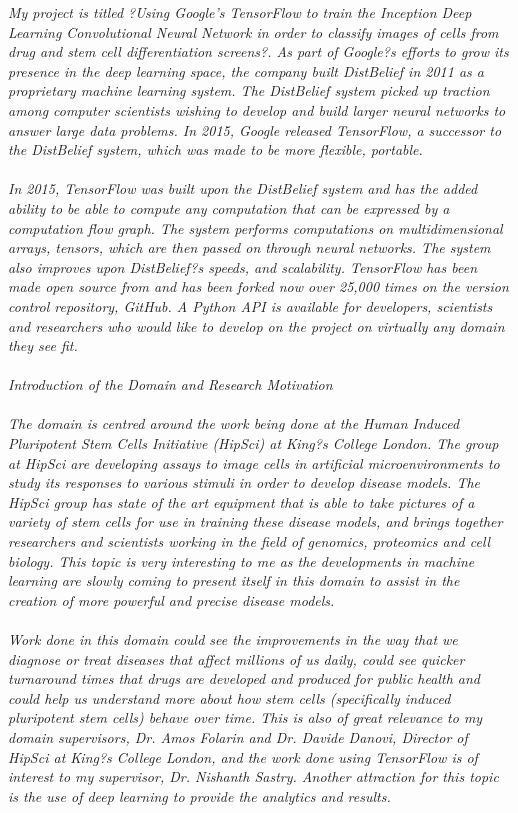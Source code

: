 \emph{My project is titled ?Using Google's TensorFlow to train the Inception Deep Learning Convolutional Neural Network in order to classify images of cells from drug and stem cell differentiation screens?. As part of Google?s efforts to grow its presence in the deep learning space, the company built DistBelief in 2011 as a proprietary machine learning system. The DistBelief system picked up traction among computer scientists wishing to develop and build larger neural networks to answer large data problems. In 2015, Google released TensorFlow, a successor to the DistBelief system, \cite{webiste:https://research.googleblog.com/2015/11/tensorflow-googles-latest-machine_9.html} which was made to be more flexible, portable. \\ \\ 
In 2015, TensorFlow was built upon the DistBelief system and has the added ability to be able to compute any computation that can be expressed by a computation flow graph. The system performs computations on multidimensional arrays, tensors, which are then passed on through neural networks. The system also improves upon DistBelief?s speeds, and scalability. TensorFlow has been made open source from and has been forked now over 25,000 times on the version control repository, GitHub. A Python API is available for developers, scientists and researchers who would like to develop on the project on virtually any domain they see fit. \\ \\ 
Introduction of the Domain and Research Motivation \\ \\ 
The domain is centred around the work being done at the Human Induced Pluripotent Stem Cells Initiative (HipSci) at King?s College London. The group at HipSci are developing assays to image cells in artificial microenvironments to study its responses to various stimuli in order to develop disease models. The HipSci group has state of the art equipment that is able to take pictures of a variety of stem cells for use in training these disease models, and brings together researchers and scientists working in the field of genomics, proteomics and cell biology. This topic is very interesting to me as the developments in machine learning are slowly coming to present itself in this domain to assist in the creation of more powerful and precise disease models. \\ \\ 
Work done in this domain could see the improvements in the way that we diagnose or treat diseases that affect millions of us daily, could see quicker turnaround times that drugs are developed and produced for public health and could help us understand more about how stem cells (specifically induced pluripotent stem cells) behave over time. This is also of great relevance to my domain supervisors, Dr. Amos Folarin and Dr. Davide Danovi, Director of HipSci at King?s College London, and the work done using TensorFlow is of interest to my supervisor, Dr. Nishanth Sastry. Another attraction for this topic is the use of deep learning to provide the analytics and results. \\ \\ 
}
